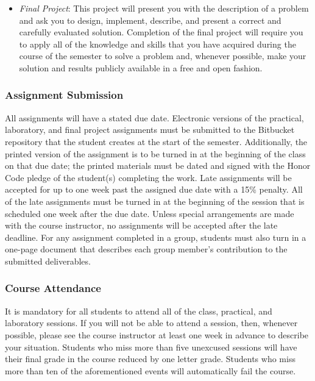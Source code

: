 \begin{itemize}
  \item {\em Final Project}: This project will present you with the description of a problem and ask you to design,
    implement, describe, and present a correct and carefully evaluated solution. Completion of the final project will
    require you to apply all of the knowledge and skills that you have acquired during the course of the semester to
    solve a problem and, whenever possible, make your solution and results publicly available in a free and open
    fashion.

\end{itemize}

\subsubsection*{Assignment Submission}

All assignments will have a stated due date. Electronic versions of the practical, laboratory, and final project
assignments must be submitted to the Bitbucket repository that the student creates at the start of the semester.
Additionally, the printed version of the assignment is to be turned in at the beginning of the class on that due date;
the printed materials must be dated and signed with the Honor Code pledge of the student(s) completing the work.  Late
assignments will be accepted for up to one week past the assigned due date with a 15\% penalty. All of the late
assignments must be turned in at the beginning of the session that is scheduled one week after the due date. Unless
special arrangements are made with the course instructor, no assignments will be accepted after the late deadline. For
any assignment completed in a group, students must also turn in a one-page document that describes each group member's
contribution to the submitted deliverables.

\subsubsection*{Course Attendance}

It is mandatory for all students to attend all of the class, practical, and laboratory sessions. If you will not be able
to attend a session, then, whenever possible, please see the course instructor at least one week in advance to describe
your situation.  Students who miss more than five unexcused sessions will have their final grade in the course reduced
by one letter grade. Students who miss more than ten of the aforementioned events will automatically fail the course.

